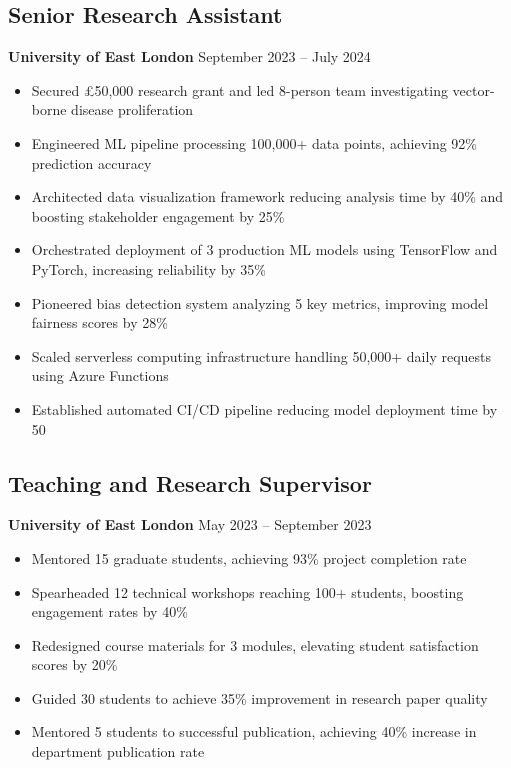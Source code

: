 \documentclass[10pt,a4paper]{article}
\begin{document}
\subsection*{Senior Research Assistant}
\textbf{University of East London} \hfill September 2023 -- July 2024
\begin{itemize}
    \item Secured £50,000 research grant and led 8-person team investigating vector-borne disease proliferation
    \item Engineered ML pipeline processing 100,000+ data points, achieving 92\% prediction accuracy
    \item Architected data visualization framework reducing analysis time by 40\% and boosting stakeholder engagement by 25\%
    \item Orchestrated deployment of 3 production ML models using TensorFlow and PyTorch, increasing reliability by 35\%
    \item Pioneered bias detection system analyzing 5 key metrics, improving model fairness scores by 28\%
    \item Scaled serverless computing infrastructure handling 50,000+ daily requests using Azure Functions
    \item Established automated CI/CD pipeline reducing model deployment time by 50%
\end{itemize}

\subsection*{Teaching and Research Supervisor}
\textbf{University of East London} \hfill May 2023 -- September 2023
\begin{itemize}
    \item Mentored 15 graduate students, achieving 93\% project completion rate
    \item Spearheaded 12 technical workshops reaching 100+ students, boosting engagement rates by 40\%
    \item Redesigned course materials for 3 modules, elevating student satisfaction scores by 20\%
    \item Guided 30 students to achieve 35\% improvement in research paper quality
    \item Mentored 5 students to successful publication, achieving 40\% increase in department publication rate
\end{itemize}
\end{document}

